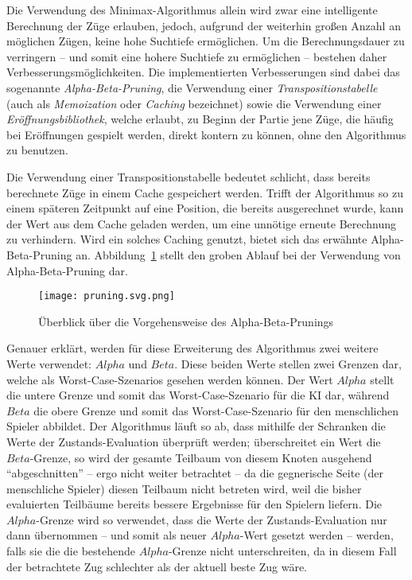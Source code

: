 Die Verwendung des Minimax-Algorithmus allein wird zwar eine intelligente Berechnung der Züge erlauben, jedoch, aufgrund der weiterhin großen Anzahl an möglichen Zügen, keine hohe Suchtiefe ermöglichen. Um die Berechnungsdauer zu verringern -- und somit eine hohere Suchtiefe zu ermöglichen -- bestehen daher Verbesserungsmöglichkeiten. Die implementierten Verbesserungen sind dabei das sogenannte \textit{Alpha-Beta-Pruning}, die Verwendung einer \textit{Transpositionstabelle} (auch als \textit{Memoization} oder \textit{Caching} bezeichnet) sowie die Verwendung einer \textit{Eröffnungsbibliothek}, welche erlaubt, zu Beginn der Partie jene Züge, die häufig bei Eröffnungen gespielt werden, direkt kontern zu können, ohne den Algorithmus zu benutzen.

Die Verwendung einer Transpositionstabelle bedeutet schlicht, dass bereits berechnete Züge in einem Cache gespeichert werden. Trifft der Algorithmus so zu einem späteren Zeitpunkt auf eine Position, die bereits ausgerechnet wurde, kann der Wert aus dem Cache geladen werden, um eine unnötige erneute Berechnung zu verhindern. Wird ein solches Caching genutzt, bietet sich das erwähnte Alpha-Beta-Pruning an. Abbildung~\ref{fig:pruning} stellt den groben Ablauf bei der Verwendung von Alpha-Beta-Pruning dar.

\begin{figure}[H]
	\texttt{[image: pruning.svg.png]}
	\caption{Überblick über die Vorgehensweise des Alpha-Beta-Prunings\footnotemark}
	\label{fig:pruning}
\end{figure}

Genauer erklärt, werden für diese Erweiterung des Algorithmus zwei weitere Werte verwendet: $Alpha$ und $Beta$. Diese beiden Werte stellen zwei Grenzen dar, welche als Worst-Case-Szenarios gesehen werden können. Der Wert $Alpha$ stellt die untere Grenze und somit das Worst-Case-Szenario für die KI dar, während $Beta$ die obere Grenze und somit das Worst-Case-Szenario für den menschlichen Spieler abbildet. Der Algorithmus läuft so ab, dass mithilfe der Schranken die Werte der Zustands-Evaluation überprüft werden; überschreitet ein Wert die $Beta$-Grenze, so wird der gesamte Teilbaum von diesem Knoten ausgehend "`abgeschnitten"' -- ergo nicht weiter betrachtet -- da die gegnerische Seite (der menschliche Spieler) diesen Teilbaum nicht betreten wird, weil die bisher evaluierten Teilbäume bereits bessere Ergebnisse für den Spielern liefern. Die $Alpha$-Grenze wird so verwendet, dass die Werte der Zustands-Evaluation nur dann übernommen -- und somit als neuer $Alpha$-Wert gesetzt werden -- werden, falls sie die die bestehende $Alpha$-Grenze nicht unterschreiten, da in diesem Fall der betrachtete Zug schlechter als der aktuell beste Zug wäre.

